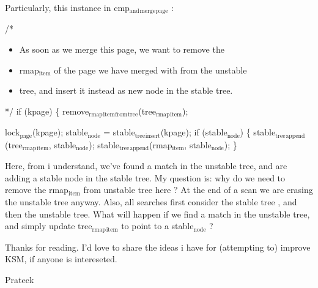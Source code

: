 \documentclass[11pt]{article}
\begin{document}
Particularly, this instance in cmp$_{\mathrm{and}}$$_{\mathrm{merge}}$$_{\mathrm{page}}$ :

        /*
\begin{itemize}
\item As soon as we merge this page, we want to remove the
\item rmap$_{\mathrm{item}}$ of the page we have merged with from the unstable
\item tree, and insert it instead as new node in the stable tree.
\end{itemize}
         */
        if (kpage) \{
            remove$_{\mathrm{rmap}}$$_{\mathrm{item}}$$_{\mathrm{from}}$$_{\mathrm{tree}}$(tree$_{\mathrm{rmap}}$$_{\mathrm{item}}$);

            lock$_{\mathrm{page}}$(kpage);
            stable$_{\mathrm{node}}$ = stable$_{\mathrm{tree}}$$_{\mathrm{insert}}$(kpage);
            if (stable$_{\mathrm{node}}$) \{
                stable$_{\mathrm{tree}}$$_{\mathrm{append}}$(tree$_{\mathrm{rmap}}$$_{\mathrm{item}}$, stable$_{\mathrm{node}}$);
                stable$_{\mathrm{tree}}$$_{\mathrm{append}}$(rmap$_{\mathrm{item}}$, stable$_{\mathrm{node}}$);
            \}

Here, from i understand, we've found a match in the unstable tree, and are adding a stable node in the stable tree.
My question is: why do we need to remove the rmap$_{\mathrm{item}}$ from unstable tree here ? At the end of a scan we are erasing the unstable tree anyway. Also, all searches first consider the stable tree , and then the unstable tree.
What will happen if we find a match in the unstable tree, and simply update tree$_{\mathrm{rmap}}$$_{\mathrm{item}}$ to point to a stable$_{\mathrm{node}}$ ? 

Thanks for reading. I'd love to share the ideas i have for (attempting to) improve KSM, if anyone is intereseted. 

Prateek
\end{document}

